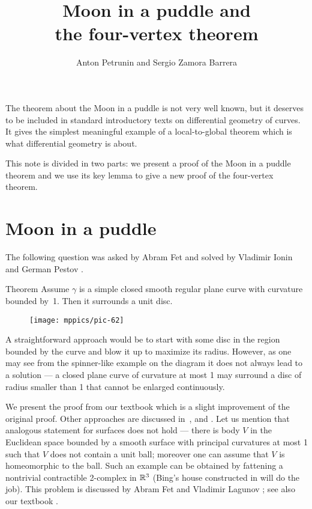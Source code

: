 \documentclass{article}
\begin{document}

\title{Moon in a puddle and\\ the four-vertex theorem}
\author{Anton Petrunin and Sergio Zamora Barrera}
\date{}
\maketitle

The theorem about the Moon in a puddle is not very well known, but it deserves to be included in standard introductory texts on differential geometry of curves.
It gives the simplest meaningful example of a local-to-global theorem which is what differential geometry is about.

This note is divided in two parts: we present a proof of the Moon in a puddle theorem and we use its key lemma to give a new proof of the four-vertex theorem. 


\section*{Moon in a puddle}

The following question was asked by Abram Fet and solved by Vladimir Ionin and German Pestov \cite{pestov-ionin}.

\begin{thm}{Theorem}\label{thm:moon-orginal}
Assume $\gamma$ is a simple closed smooth regular plane curve with curvature bounded by~1.
Then it surrounds a unit disc.
\end{thm}


{

\begin{wrapfigure}{r}{33 mm}
\vskip-6mm
\centering
\texttt{[image: mppics/pic-62]}
\vskip0mm
\end{wrapfigure}

A straightforward approach would be to start with some disc in the region bounded by the curve and blow it up to maximize its radius.
However, as one may see from the spinner-like example on the diagram it does not always lead to a solution --- a closed plane curve of curvature at most 1 may surround a disc of radius smaller than 1 that cannot be enlarged continuously.

}

We present the proof from our textbook \cite{petrunin-zamora} which is a slight improvement of the original proof.
Other approaches are discussed in~\cite{petrunin-2020,panov-petrunin,pankrashkin}, and \cite[Problem 1.7.19]{toponogov}.
Let us mention that analogous statement for surfaces does not hold --- there is body $V$ in the Euclidean space bounded by a smooth surface with principal curvatures at most 1 such that $V$ does not contain a unit ball; moreover one can assume that $V$ is homeomorphic to the ball.
Such an example can be obtained by fattening a nontrivial contractible 2-complex in $\mathbb{R}^3$ 
(Bing's house constructed in \cite{bing} will do the job).
This problem is discussed by Abram Fet and Vladimir Lagunov \cite{lagunov-2,lagunov-fet}; see also our textbook \cite{petrunin-zamora}.
\end{document}
